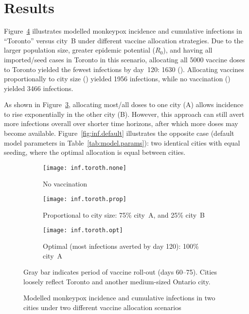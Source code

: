 \section{Results}
Figure~\ref{fig:toroth} illustrates modelled monkeypox incidence and cumulative infections
in ``Toronto'' versus city~B under different vaccine allocation strategies.
Due to the larger population size,
greater epidemic potential ($R_0$), and
having all imported/seed cases in Toronto in this scenario,
allocating all 5000 vaccine doses to Toronto
yielded the fewest infections by day~120: 1630 (). %
Allocating vaccines proportionally to city size () yielded 1956 infections, %
while no vaccination () yielded 3466 infections. %
\par
As shown in Figure~\ref{fig:inf.toroth.opt}, allocating most/all doses to one city (A)
allows incidence to rise exponentially in the other city (B).
However, this approach can still avert more infections overall over shorter time horizons,
after which more doses may become available.
Figure~\ref{fig:inf.default} illustrates the opposite case
(default model parameters in Table~\ref{tab:model.params}): two identical cities with equal seeding,
where the optimal allocation is equal between cities.
\begin{figure}[h]
  \begin{subfigure}{\linewidth}
    \texttt{[image: inf.toroth.none]}
    \caption{No vaccination}
    \label{fig:inf.toroth.none}
  \end{subfigure}
  \begin{subfigure}{\linewidth}
    \texttt{[image: inf.toroth.prop]}
    \caption{Proportional to city size: 75\% city~A, and 25\% city~B}
    \label{fig:inf.toroth.prop}
  \end{subfigure}
  \begin{subfigure}{\linewidth}
    \texttt{[image: inf.toroth.opt]}
    \caption{Optimal (most infections averted by day 120): 100\% city~A}
    \label{fig:inf.toroth.opt}
  \end{subfigure}
  \caption{Modelled monkeypox incidence and cumulative infections in two cities
    under two different vaccine allocation scenarios}
  \label{fig:toroth}
  \floatfoot
  Gray bar indicates period of vaccine roll-out (days 60--75).
  Cities loosely reflect Toronto and another medium-sized Ontario city.
\end{figure}
\par
